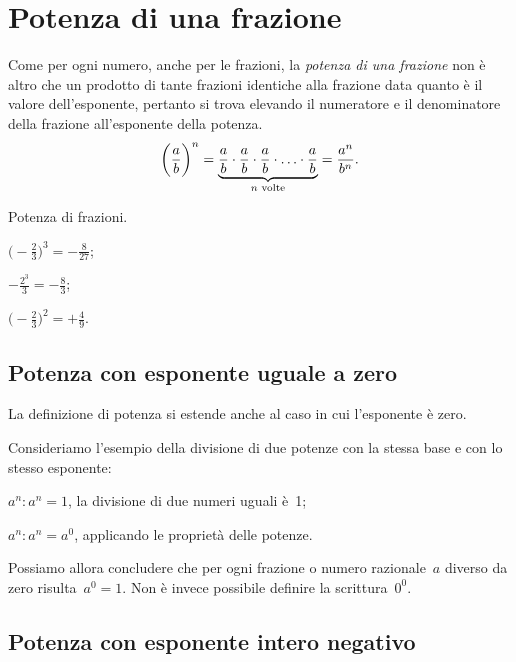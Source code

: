 \ovalbox{\risolvii \ref{ese:3.57}, \ref{ese:3.58}, \ref{ese:3.59}, \ref{ese:3.60}}

\section{Potenza di una frazione}
Come per ogni numero, anche per le frazioni, la \emph{potenza di una frazione} non è
altro che un prodotto di tante frazioni identiche alla frazione data quanto è il valore dell'esponente,
pertanto si trova elevando il numeratore e il denominatore della frazione all'esponente della potenza.
\[\bigg(\frac{a}{b}\bigg)^n=\underbrace{\frac{a}{b}\cdot\frac{a}{b}\cdot\frac{a}{b}\cdot\ldots\cdot\frac{a}{b}}_%
{n\text{ volte}}=\frac{a^n}{b^n}.\]
\begin{exrig}
\begin{esempio}
Potenza di frazioni.
\begin{multicols}{3}
\begin{itemize*}
\item $\displaystyle{\bigg(-\frac{2}{3}\bigg)^3=-\frac{8}{27}}$;
\item $\displaystyle{-\frac{2^3}{3}=-\frac{8}{3}}$;
\item $\displaystyle{\bigg(-\frac{2}{3}\bigg)^2=+\frac{4}{9}}$.
\end{itemize*}
\end{multicols}
\end{esempio}
\end{exrig}

\subsection{Potenza con esponente uguale a zero}
La definizione di potenza si estende anche al caso in cui l'esponente è zero.

Consideriamo l'esempio della divisione di due potenze con la stessa base e con lo stesso esponente:
\begin{itemize*}
\item $a^n:a^n=1$, la divisione di due numeri uguali è~1;
\item $a^n:a^n=a^0$, applicando le proprietà delle potenze.
\end{itemize*}

Possiamo allora concludere che per ogni frazione o numero razionale~$a$ diverso da zero risulta~$a^0=1$.
Non è invece possibile definire la scrittura~$0^0$.

\subsection{Potenza con esponente intero negativo}\label{sect:potenza_esponente_negativo}

